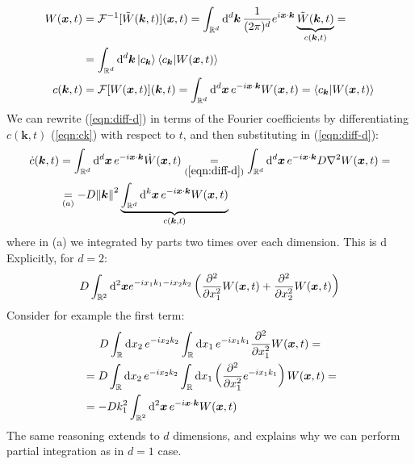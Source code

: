 \documentclass[../template.tex]{subfiles}
\begin{document}
\begin{exo}
    \begin{align} \label{eqn:inv-t}
        W(\bm{x},t) &= \mathcal{F}^{-1}[\tilde{W}(\bm{k},t)](\bm{x},t) = \int_{\mathbb{R}^d} \dd[d]{\bm{k}} \frac{1}{(2 \pi)^d}  e^{i\bm{x} \cdot \bm{k}} \underbrace{\tilde{W}(\bm{k},t)}_{c(\bm{k},t)} =\\ \nonumber
        &= \int_{\mathbb{R}^d} \dd[d]{\bm{k}} \ket{c_{\bm{k}}} \langle c_{\bm{k}}|W(\bm{x},t) \rangle\\
        c(\bm{k},t) &= \mathcal{F}[W(\bm{x},t)](\bm{k},t) = \int_{\mathbb{R}^d} \dd[d]{\bm{x}} e^{-i\bm{x} \cdot \bm{k}} W(\bm{x},t) = \langle c_{\bm{k}}|W(\bm{x},t) \rangle \label{eqn:ck}
    \end{align}
    We can rewrite (\ref{eqn:diff-d}) in terms of the Fourier coefficients by differentiating $c(\bm{k},t)$ (\ref{eqn:ck}) with respect to $t$, and then substituting in (\ref{eqn:diff-d}):
    \begin{align*}
        \dot{c}(\bm{k},t) &= \int_{\mathbb{R}^d} \dd[d]{\bm{x}} e^{-i\bm{x} \cdot \bm{k}} \dot{W}(\bm{x},t) \underset{(\ref{eqn:diff-d})}{=} \int_{\mathbb{R}^d} \dd[d]{\bm{x}} e^{-i\bm{x} \cdot \bm{k}} D \nabla^2 W(\bm{x},t) = \\
        &\underset{(a)}{=}  -D \norm{\bm{k}}^2\underbrace{ \int_{\mathbb{R}^d} \dd[k]{\bm{x}} e^{-i\bm{x} \cdot \bm{k}} W(\bm{x},t)}_{c(\bm{k},t)}
    \end{align*}
    where in (a) we integrated by parts two times over each dimension. This is d Explicitly, for $d=2$:
    \begin{align*}
        D \int_{\mathbb{R}^2} \dd[2]\bm{x} e^{-i x_1 k_1 - ix_2 k_2} \left(\pdv[2]{x_1} W(\bm{x},t) + \pdv[2]{x_2} W(\bm{x},t)\right)
    \end{align*}
    Consider for example the first term:
    \begin{align*}
        D\int_{\mathbb{R}} \dd{x_2} e^{-ix_2 k_2} \int_{\mathbb{R}} \dd{x_1} e^{-i x_1 k_1} \pdv[2]{x_1} W(\bm{x},t) =\span \\
        &=D \int_\mathbb{R} \dd{x_2} e^{-ix_2 k_2} \int_{\mathbb{R}} \dd{x_1} \left(\pdv[2]{x_1} e^{-ix_1 k_1}\right) W(\bm{x},t) =\\
        &= -Dk_1^2 \int_{\mathbb{R}^2} \dd[2]{\bm{x}} e^{-i\bm{x} \cdot \bm{k}} W(\bm{x},t) 
    \end{align*}
    The same reasoning extends to $d$ dimensions, and explains why we can perform partial integration as in $d=1$ case.

    \medskip


\end{exo}
\end{document}
